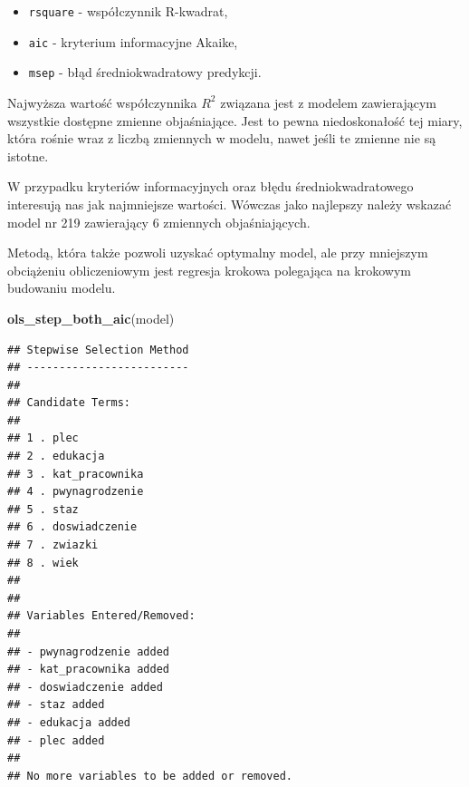 \documentclass[]{book}
\newenvironment{Shaded}{\begin{snugshade}}{\end{snugshade}}
\newcommand{\KeywordTok}[1]{\textcolor[rgb]{0.13,0.29,0.53}{\textbf{#1}}}
\newcommand{\NormalTok}[1]{#1}
\providecommand{\tightlist}{%
  \setlength{\itemsep}{0pt}\setlength{\parskip}{0pt}}
\begin{document}
\begin{itemize}
\tightlist
\item
  \texttt{rsquare} - współczynnik R-kwadrat,
\item
  \texttt{aic} - kryterium informacyjne Akaike,
\item
  \texttt{msep} - błąd średniokwadratowy predykcji.
\end{itemize}

Najwyższa wartość współczynnika \(R^2\) związana jest z modelem zawierającym wszystkie dostępne zmienne objaśniające. Jest to pewna niedoskonałość tej miary, która rośnie wraz z liczbą zmiennych w modelu, nawet jeśli te zmienne nie są istotne.

W przypadku kryteriów informacyjnych oraz błędu średniokwadratowego interesują nas jak najmniejsze wartości. Wówczas jako najlepszy należy wskazać model nr 219 zawierający 6 zmiennych objaśniających.

Metodą, która także pozwoli uzyskać optymalny model, ale przy mniejszym obciążeniu obliczeniowym jest regresja krokowa polegająca na krokowym budowaniu modelu.

\begin{Shaded}
\begin{Highlighting}[]
\KeywordTok{ols_step_both_aic}\NormalTok{(model)}
\end{Highlighting}
\end{Shaded}

\begin{verbatim}
## Stepwise Selection Method 
## -------------------------
## 
## Candidate Terms: 
## 
## 1 . plec 
## 2 . edukacja 
## 3 . kat_pracownika 
## 4 . pwynagrodzenie 
## 5 . staz 
## 6 . doswiadczenie 
## 7 . zwiazki 
## 8 . wiek 
## 
## 
## Variables Entered/Removed: 
## 
## - pwynagrodzenie added 
## - kat_pracownika added 
## - doswiadczenie added 
## - staz added 
## - edukacja added 
## - plec added 
## 
## No more variables to be added or removed.
\end{verbatim}
\end{document}
